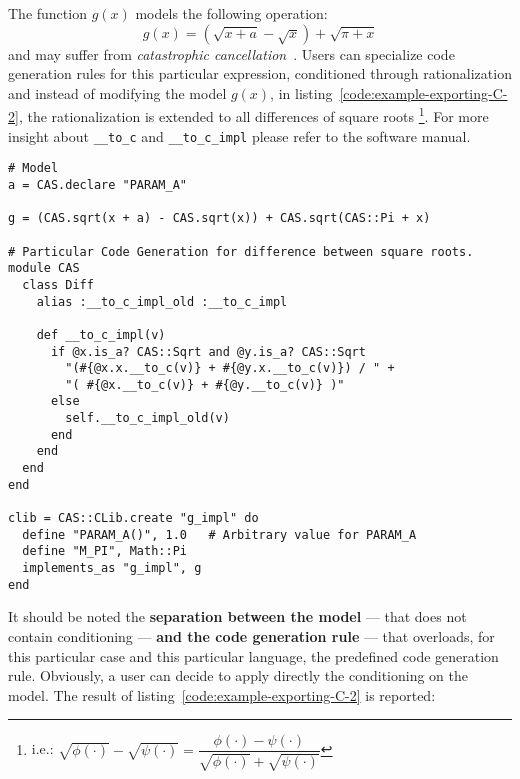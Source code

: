 The function $g(x)$ models the following operation:
\begin{equation}
g(x) = (\sqrt{x + a} - \sqrt{x}) + \sqrt{\pi + x}
\end{equation}
and may suffer from \emph{catastrophic cancellation}~\cite{higham2002accuracy}. Users can specialize code generation rules for this particular expression, conditioned through rationalization and instead of modifying the model $g(x)$, in listing~\ref{code:example-exporting-C-2}, the rationalization is extended to all differences of square roots
\footnote{i.e.:
$\sqrt{\phi(\cdot)} - \sqrt{\psi(\cdot)} =
\dfrac{\phi(\cdot) - \psi(\cdot)}{\sqrt{\phi(\cdot)} + \sqrt{\psi(\cdot)}}$}.
For more insight about \texttt{\_\_to\_c} and \texttt{\_\_to\_c\_impl} please refer to the software manual.

\noindent%
\begin{lstlisting}[caption={Conditioning in exporting function},label={code:example-exporting-C-2}]
# Model
a = CAS.declare "PARAM_A"

g = (CAS.sqrt(x + a) - CAS.sqrt(x)) + CAS.sqrt(CAS::Pi + x)

# Particular Code Generation for difference between square roots.
module CAS
  class Diff
    alias :__to_c_impl_old :__to_c_impl

    def __to_c_impl(v)
      if @x.is_a? CAS::Sqrt and @y.is_a? CAS::Sqrt
        "(#{@x.x.__to_c(v)} + #{@y.x.__to_c(v)}) / " +
        "( #{@x.__to_c(v)} + #{@y.__to_c(v)} )"
      else
        self.__to_c_impl_old(v)
      end
    end
  end
end

clib = CAS::CLib.create "g_impl" do
  define "PARAM_A()", 1.0   # Arbitrary value for PARAM_A
  define "M_PI", Math::Pi
  implements_as "g_impl", g
end
\end{lstlisting}
It should be noted the \textbf{separation between the model} --- that does not contain conditioning --- \textbf{and the code generation rule} --- that overloads, for this particular case and this particular language, the predefined code generation rule. Obviously, a user can decide to apply directly the conditioning on the model. The result of listing~\ref{code:example-exporting-C-2} is reported:

\noindent%
  \begin{minipage}{.5\textwidth}
    
  \end{minipage}\hfill
  \begin{minipage}{.5\textwidth}
    
  \end{minipage}

